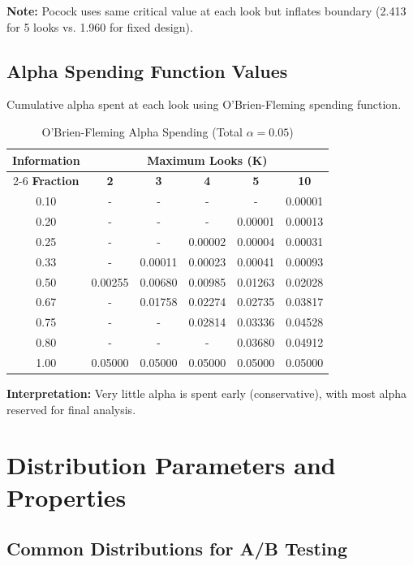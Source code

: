 \textbf{Note:} Pocock uses same critical value at each look but inflates boundary (2.413 for 5 looks vs. 1.960 for fixed design).

\subsection{Alpha Spending Function Values}

Cumulative alpha spent at each look using O'Brien-Fleming spending function.

\begin{table}[h]
\centering
\caption{O'Brien-Fleming Alpha Spending (Total $\alpha = 0.05$)}
\begin{tabular}{c|ccccc}
\toprule
\textbf{Information} & \multicolumn{5}{c}{\textbf{Maximum Looks (K)}} \\
\cmidrule{2-6}
\textbf{Fraction} & \textbf{2} & \textbf{3} & \textbf{4} & \textbf{5} & \textbf{10} \\
\midrule
0.10 & - & - & - & - & 0.00001 \\
0.20 & - & - & - & 0.00001 & 0.00013 \\
0.25 & - & - & 0.00002 & 0.00004 & 0.00031 \\
0.33 & - & 0.00011 & 0.00023 & 0.00041 & 0.00093 \\
0.50 & 0.00255 & 0.00680 & 0.00985 & 0.01263 & 0.02028 \\
0.67 & - & 0.01758 & 0.02274 & 0.02735 & 0.03817 \\
0.75 & - & - & 0.02814 & 0.03336 & 0.04528 \\
0.80 & - & - & - & 0.03680 & 0.04912 \\
1.00 & 0.05000 & 0.05000 & 0.05000 & 0.05000 & 0.05000 \\
\bottomrule
\end{tabular}
\end{table}

\textbf{Interpretation:} Very little alpha is spent early (conservative), with most alpha reserved for final analysis.

\newpage

\section{Distribution Parameters and Properties}

\subsection{Common Distributions for A/B Testing}

